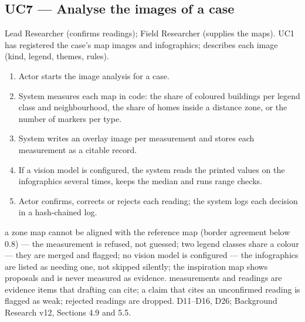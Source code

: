 \subsection{UC7 --- Analyse the images of a case\added}
 Lead Researcher (confirms readings); Field Researcher (supplies the maps).
 UC1 has registered the case's map images and infographics;  describes each image (kind, legend, themes, rules).
\begin{enumerate}
\item Actor starts the image analysis for a case.
\item System measures each map in code: the share of coloured buildings per legend class and neighbourhood, the share of homes inside a distance zone, or the number of markers per type.
\item System writes an overlay image per measurement and stores each measurement as a citable record.
\item If a vision model is configured, the system reads the printed values on the infographics several times, keeps the median and runs range checks.
\item Actor confirms, corrects or rejects each reading; the system logs each decision in a hash-chained log.
\end{enumerate}
 a zone map cannot be aligned with the reference map (border agreement below 0.8) --- the measurement is refused, not guessed; two legend classes share a colour --- they are merged and flagged; no vision model is configured --- the infographics are listed as needing one, not skipped silently; the inspiration map shows proposals and is never measured as evidence.
 measurements and readings are evidence items that drafting can cite; a claim that cites an unconfirmed reading is flagged as weak; rejected readings are dropped.
 D11--D16, D26; Background Research v12, Sections 4.9 and 5.5.


